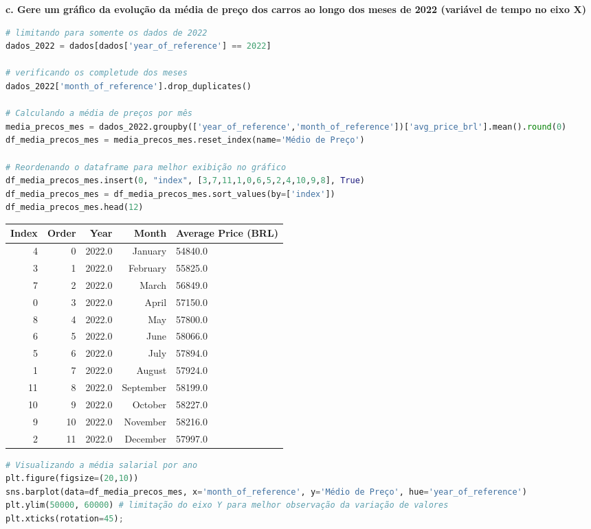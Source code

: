 \begin{adjustwidth}{1em}{}
\textbf{c. Gere um gráfico da evolução da média de preço dos carros ao longo dos meses de 2022 (variável de tempo no eixo X)}
\end{adjustwidth}
\begin{lstlisting}[language=Python, style=input]
# limitando para somente os dados de 2022
dados_2022 = dados[dados['year_of_reference'] == 2022]

# verificando os completude dos meses
dados_2022['month_of_reference'].drop_duplicates()

# Calculando a média de preços por mês
media_precos_mes = dados_2022.groupby(['year_of_reference','month_of_reference'])['avg_price_brl'].mean().round(0) 
df_media_precos_mes = media_precos_mes.reset_index(name='Médio de Preço')

# Reordenando o dataframe para melhor exibição no gráfico
df_media_precos_mes.insert(0, "index", [3,7,11,1,0,6,5,2,4,10,9,8], True)
df_media_precos_mes = df_media_precos_mes.sort_values(by=['index'])
df_media_precos_mes.head(12)
\end{lstlisting}
\begin{table}[H]
\centering
\begin{tabular}{rrrrl}
\hline
\textbf{Index} & \textbf{Order} & \textbf{Year} & \textbf{Month} & \textbf{Average Price (BRL)} \\
\hline
4 & 0 & 2022.0 & January & 54840.0 \\
3 & 1 & 2022.0 & February & 55825.0 \\
7 & 2 & 2022.0 & March & 56849.0 \\
0 & 3 & 2022.0 & April & 57150.0 \\
8 & 4 & 2022.0 & May & 57800.0 \\
6 & 5 & 2022.0 & June & 58066.0 \\
5 & 6 & 2022.0 & July & 57894.0 \\
1 & 7 & 2022.0 & August & 57924.0 \\
11 & 8 & 2022.0 & September & 58199.0 \\
10 & 9 & 2022.0 & October & 58227.0 \\
9 & 10 & 2022.0 & November & 58216.0 \\
2 & 11 & 2022.0 & December & 57997.0 \\
\hline
\end{tabular}
\label{tab:avg_price_2022}
\end{table}
\begin{lstlisting}[language=Python, style=input]
# Visualizando a média salarial por ano
plt.figure(figsize=(20,10)) 
sns.barplot(data=df_media_precos_mes, x='month_of_reference', y='Médio de Preço', hue='year_of_reference')
plt.ylim(50000, 60000) # limitação do eixo Y para melhor observação da variação de valores
plt.xticks(rotation=45);
\end{lstlisting}
